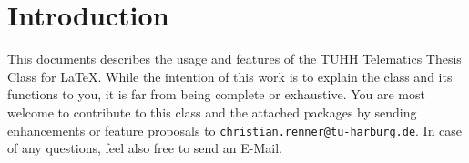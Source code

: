 \chapter{Introduction}

This documents describes the usage and features of the TUHH Telematics Thesis Class for \LaTeX. While the intention of this work is to explain the class and its functions to you, it is far from being complete or exhaustive. You are most welcome to contribute to this class and the attached packages by sending enhancements or feature proposals to \texttt{christian.renner@tu-harburg.de}. In case of any questions, feel also free to send an E-Mail.



